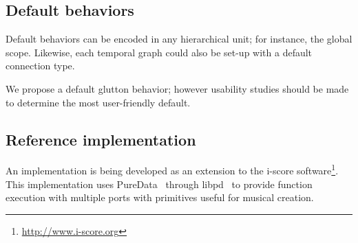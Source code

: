 \documentclass{article}
\begin{document}
\subsection{Default behaviors}
Default behaviors can be encoded in any hierarchical unit; for instance, the global scope. 
Likewise, each temporal graph could also be set-up with a default connection type.

We propose a default glutton behavior; however usability studies should be made to determine the most user-friendly default.

\subsection{Reference implementation}
An implementation is being developed as an extension to the i-score software\footnote{\url{http://www.i-score.org}}. 
This implementation uses PureData~\cite{puckette1996pure} through libpd~\cite{brinkmann2011embedding} to provide function execution with multiple ports
with primitives useful for musical creation.
\end{document}

